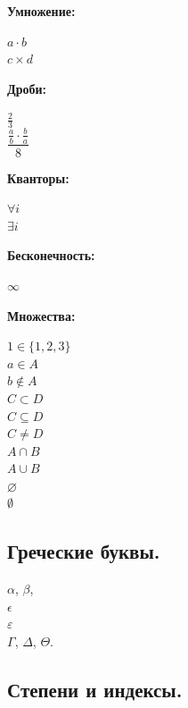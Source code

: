 \documentclass[12pt]{article}
\begin{document}
\textbf{Умножение:}

\begin{LTXexample}
$a \cdot b$ \\ 
$c \times d$
 \end{LTXexample}
 
 \textbf{Дроби:}

\begin{LTXexample}
 $\frac{2}{3}$ \\
 $\dfrac{\frac{a}{b} \cdot \frac{b}{a}}{8}$
 \end{LTXexample}
 
\textbf{Кванторы:} 

\begin{LTXexample}
 $\forall i $ \\
 $\exists i$
 \end{LTXexample}
 
\textbf{Бесконечность:}

\begin{LTXexample}
$\infty$
 \end{LTXexample}

\textbf{Множества:}

\begin{LTXexample}
$1 \in \{1,2,3\}$ \\ 
$a \in A$ \\
$b \notin A$ \\
$C \subset D$ \\
$C \subseteq D$ \\
$C \ne D$ \\
$A \cap B$ \\
$A \cup B$ \\
$\varnothing$ \\
$\emptyset$
 \end{LTXexample}


\subsection{Греческие буквы.}

\begin{LTXexample}
$\alpha$, $\beta$, \\
$\epsilon$ \\
$\varepsilon$  \\
$\Gamma$, $\Delta$, $\Theta$.
 \end{LTXexample}

\subsection{Степени и индексы.}
\end{document}

